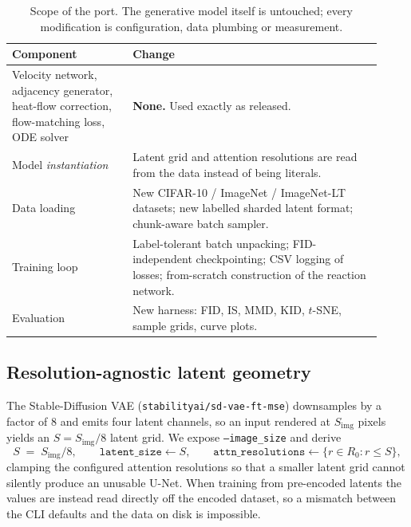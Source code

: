 \documentclass[11pt]{article}
\newcommand{\code}[1]{\texttt{\small #1}}
\begin{document}
\begin{table}[t]
  \centering
  \small
  \begin{tabular}{p{0.30\linewidth} p{0.62\linewidth}}
    \toprule
    Component & Change \\
    \midrule
    Velocity network, adjacency generator, heat-flow correction, flow-matching
      loss, ODE solver
      & \textbf{None.} Used exactly as released. \\
    Model \emph{instantiation}
      & Latent grid and attention resolutions are read from the data instead of
        being literals. \\
    Data loading
      & New CIFAR-10 / ImageNet / ImageNet-LT datasets; new labelled sharded
        latent format; chunk-aware batch sampler. \\
    Training loop
      & Label-tolerant batch unpacking; FID-independent checkpointing; CSV
        logging of losses; from-scratch construction of the reaction network. \\
    Evaluation
      & New harness: FID, IS, MMD, KID, $t$-SNE, sample grids, curve plots. \\
    \bottomrule
  \end{tabular}
  \caption{Scope of the port. The generative model itself is untouched; every
  modification is configuration, data plumbing or measurement.}
  \label{tab:scope}
\end{table}

\subsection{Resolution-agnostic latent geometry}
\label{sec:resolution}

The Stable-Diffusion VAE (\code{stabilityai/sd-vae-ft-mse}) downsamples by a
factor of $8$ and emits four latent channels, so an input rendered at
$S_{\text{img}}$ pixels yields an $S = S_{\text{img}}/8$ latent grid. We expose
\code{--image\_size} and derive
\begin{equation*}
  S \;=\; S_{\text{img}}/8, \qquad
  \texttt{latent\_size} \leftarrow S, \qquad
  \texttt{attn\_resolutions} \leftarrow \{r \in R_0 : r \le S\},
\end{equation*}
clamping the configured attention resolutions so that a smaller latent grid
cannot silently produce an unusable U-Net. When training from pre-encoded
latents the values are instead read directly off the encoded dataset, so a
mismatch between the CLI defaults and the data on disk is impossible.
\end{document}
